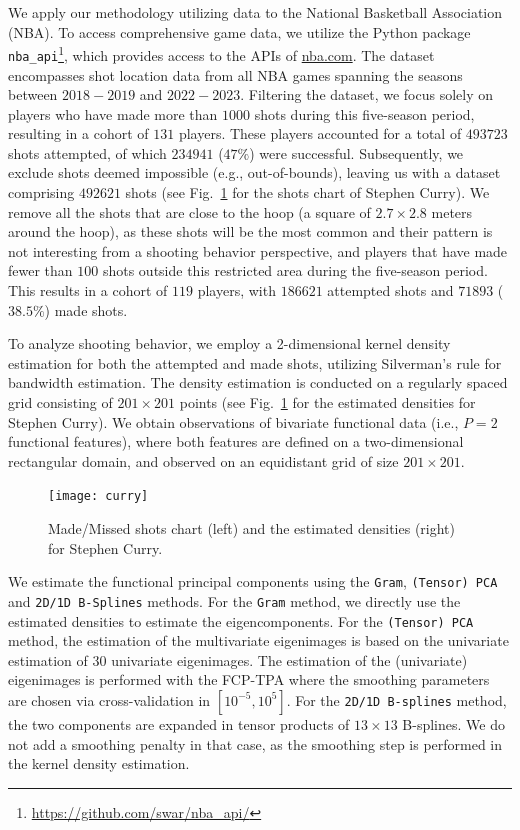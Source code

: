 \documentclass[times,sort&compress,3p]{elsarticle}
\theoremstyle{plain}%
\theoremstyle{definition}
\begin{document}
We apply our methodology utilizing data to the National Basketball Association (NBA). To access comprehensive game data, we utilize the Python package \texttt{nba\_api}\footnote{\url{https://github.com/swar/nba_api/}}, which provides access to the APIs of \url{nba.com}. The dataset encompasses shot location data from all NBA games spanning the seasons between $2018-2019$ and $2022-2023$. Filtering the dataset, we focus solely on players who have made more than $1000$ shots during this five-season period, resulting in a cohort of $131$ players. These players accounted for a total of $493723$ shots attempted, of which $234941$ ($47\%$) were successful. Subsequently, we exclude shots deemed impossible (e.g., out-of-bounds), leaving us with a dataset comprising $492621$ shots (see Fig.~\ref{fig:shoots_make_miss} for the shots chart of Stephen Curry). We remove all the shots that are close to the hoop (a square of $2.7 \times 2.8$ meters around the hoop), as these shots will be the most common and their pattern is not interesting from a shooting behavior perspective, and players that have made fewer than $100$ shots outside this restricted area during the five-season period. This results in a cohort of $119$ players, with $186621$ attempted shots and $71893$ ($38.5\%$) made shots.

To analyze shooting behavior, we employ a 2-dimensional kernel density estimation for both the attempted and made shots, utilizing Silverman's rule \citep{silvermanDensityEstimationStatistics1986} for bandwidth estimation. The density estimation is conducted on a regularly spaced grid consisting of $201 \times 201$ points (see Fig.~\ref{fig:shoots_make_miss} for the estimated densities for Stephen Curry). We obtain observations of bivariate functional data (i.e., $P = 2$ functional features), where both features are defined on a two-dimensional rectangular domain, and observed on an equidistant grid of size $201 \times 201$.
\begin{figure}
    \centering
    \texttt{[image: curry]}
    \caption{Made/Missed shots chart (left) and the estimated densities (right) for Stephen Curry.}
    \label{fig:shoots_make_miss}
\end{figure}


We estimate the functional principal components using the \texttt{Gram}, \texttt{(Tensor) PCA} and \texttt{2D/1D B-Splines} methods. For the \texttt{Gram} method, we directly use the estimated densities to estimate the eigencomponents. For the \texttt{(Tensor) PCA} method, the estimation of the multivariate eigenimages is based on the univariate estimation of $30$ univariate eigenimages. The estimation of the (univariate) eigenimages is performed with the FCP-TPA where the smoothing parameters are chosen via cross-validation in $[10^{-5}, 10^5]$. For the \texttt{2D/1D B-splines} method, the two components are expanded in tensor products of $13 \times 13$ B-splines. We do not add a smoothing penalty in that case, as the smoothing step is performed in the kernel density estimation.
\end{document}
